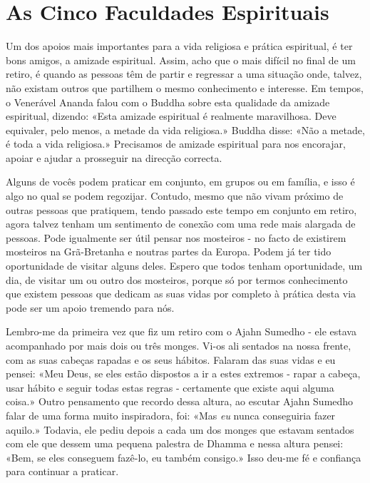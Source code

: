 \chapter{As Cinco Faculdades Espirituais}

Um dos apoios mais importantes para a vida religiosa e prática
espiritual, é ter bons amigos, a amizade espiritual. Assim, acho que o
mais difícil no final de um retiro, é quando as pessoas têm de partir e
regressar a uma situação onde, talvez, não existam outros que partilhem
o mesmo conhecimento e interesse. Em tempos, o Venerável Ananda falou
com o Buddha sobre esta qualidade da amizade espiritual, dizendo: «Esta
amizade espiritual é realmente maravilhosa. Deve equivaler, pelo menos,
a metade da vida religiosa.» Buddha disse: «Não a metade, é toda a vida
religiosa.» Precisamos de amizade espiritual para nos encorajar, apoiar
e ajudar a prosseguir na direcção correcta.

Alguns de vocês podem praticar em conjunto, em grupos ou em família, e
isso é algo no qual se podem regozijar. Contudo, mesmo que não vivam
próximo de outras pessoas que pratiquem, tendo passado este tempo em
conjunto em retiro, agora talvez tenham um sentimento de conexão com uma
rede mais alargada de pessoas. Pode igualmente ser útil pensar nos
mosteiros - no facto de existirem mosteiros na Grã-Bretanha e noutras
partes da Europa. Podem já ter tido oportunidade de visitar alguns
deles. Espero que todos tenham oportunidade, um dia, de visitar um ou
outro dos mosteiros, porque só por termos conhecimento que existem
pessoas que dedicam as suas vidas por completo à prática desta via pode
ser um apoio tremendo para nós.

Lembro-me da primeira vez que fiz um retiro com o Ajahn Sumedho - ele
estava acompanhado por mais dois ou três monges. Vi-os ali sentados na
nossa frente, com as suas cabeças rapadas e os seus hábitos. Falaram das
suas vidas e eu pensei: «Meu Deus, se eles estão dispostos a ir a estes
extremos - rapar a cabeça, usar hábito e seguir todas estas regras -
certamente que existe aqui alguma coisa.» Outro pensamento que recordo
dessa altura, ao escutar Ajahn Sumedho falar de uma forma muito
inspiradora, foi: «Mas \emph{eu} nunca conseguiria fazer aquilo.»
Todavia, ele pediu depois a cada um dos monges que estavam sentados com
ele que dessem uma pequena palestra de Dhamma e nessa altura pensei:
«Bem, se eles conseguem fazê-lo, eu também consigo.» Isso deu-me fé e
confiança para continuar a praticar.

